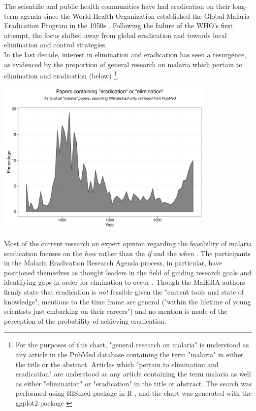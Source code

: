 \documentclass{article}
\begin{document}
\noindent The scientific and public health communities have had eradication on their long-term agenda since the World Health Organization established the Global Malaria Eradication Program in the 1950s \cite{Alonso2011, Njera2011}. Following the failure of the WHO's first attempt, the focus shifted away from global eradication and towards local elimination and control strategies. \\


\noindent In the last decade, interest in elimination and eradication has seen a resurgence, as evidenced by the proportion of general research on malaria which pertain to elimination and eradication (below) \footnote{For the purposes of this chart, "general research on malaria" is understood as any article in the PubMed database containing the term "malaria" in either the title or the abstract. Articles which "pertain to elimination and eradication" are understood as any article containing the term malaria as well as either "elimination" or "eradication" in the title or abstract. The search was performed using RISmed package \cite{Kovalchik2015} in R \cite{R}, and the chart was generated with the ggplot2 package \cite{ggplot2}}.

\begin{center}
\includegraphics[height=3in]{pubmed2.pdf}
\end{center}


\noindent Most of the current research on expert opinion regarding the feasibility of malaria eradication focuses on the \emph{how} rather than the \emph{if} and the \emph{when} \cite{Tanner2015}. The participants in the Malaria Eradication Research Agenda process, in particular, have positioned themselves as thought leaders in the field of guiding research goals and identifying gaps in order for elmination to occur \cite{Alonso2011}. Though the MalERA authors firmly state that eradication is \emph{not} feasible given the "current tools and state of knowledge", mentions to the time frame are general ("within the lifetime of young scientists just embarking on their careers") and no mention is made of the perception of the probability of achieving eradication.  \\
\end{document}
